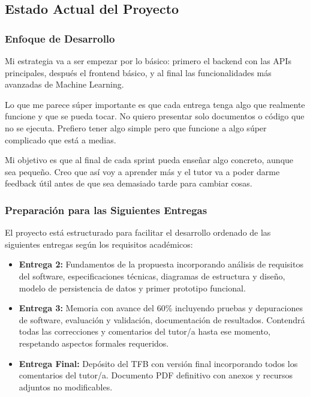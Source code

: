 \documentclass[12pt,a4paper,spanish]{article}
\begin{document}
\subsection{Estado Actual del Proyecto}

\subsubsection{Enfoque de Desarrollo}

Mi estrategia va a ser empezar por lo básico: primero el backend con las APIs principales, después el frontend básico, y al final las funcionalidades más avanzadas de Machine Learning.

Lo que me parece súper importante es que cada entrega tenga algo que realmente funcione y que se pueda tocar. No quiero presentar solo documentos o código que no se ejecuta. Prefiero tener algo simple pero que funcione a algo súper complicado que está a medias.

Mi objetivo es que al final de cada sprint pueda enseñar algo concreto, aunque sea pequeño. Creo que así voy a aprender más y el tutor va a poder darme feedback útil antes de que sea demasiado tarde para cambiar cosas.

\subsubsection{Preparación para las Siguientes Entregas}

El proyecto está estructurado para facilitar el desarrollo ordenado de las siguientes entregas según los requisitos académicos:

\begin{itemize}
    \item \textbf{Entrega 2:} Fundamentos de la propuesta incorporando análisis de requisitos del software, especificaciones técnicas, diagramas de estructura y diseño, modelo de persistencia de datos y primer prototipo funcional.
    
    \item \textbf{Entrega 3:} Memoria con avance del 60\% incluyendo pruebas y depuraciones de software, evaluación y validación, documentación de resultados. Contendrá todas las correcciones y comentarios del tutor/a hasta ese momento, respetando aspectos formales requeridos.
    
    \item \textbf{Entrega Final:} Depósito del TFB con versión final incorporando todos los comentarios del tutor/a. Documento PDF definitivo con anexos y recursos adjuntos no modificables.
\end{itemize}
\end{document}
